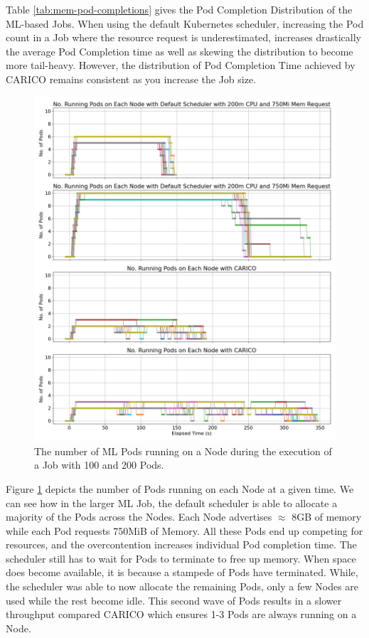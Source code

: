 Table \ref{tab:mem-pod-completions} gives the Pod Completion Distribution of the
ML-based Jobs. When using the default Kubernetes scheduler, increasing the Pod
count in a Job where the resource request is underestimated, increases
drastically the average Pod Completion time as well as skewing the distribution
to become more tail-heavy. However, the distribution of Pod Completion Time
achieved by CARICO remains consistent as you increase the Job size.

\begin{figure}[H]
    \centering
    \includegraphics[width=\textwidth]{images/ml-running-pods.png}
    \caption{The number of ML Pods running on a Node during the
    execution of a Job with 100 and 200 Pods.}
    \label{fig:ml-pod-running}
\end{figure}
Figure \ref{fig:ml-pod-running} depicts the number of Pods running on each Node
at a given time. We can see how in the larger ML Job, the default scheduler is
able to allocate a majority of the Pods across the Nodes. Each Node advertises
$\approx$ 8GB of memory while each Pod requests 750MiB of Memory. All these Pods
end up competing for resources, and the overcontention increases individual
Pod completion time. The scheduler still has to wait for Pods to terminate to
free up memory. When space does become available, it is because a
stampede of Pods have terminated. While, the scheduler was able to now allocate
the remaining Pods, only a few Nodes are used while the rest become idle. This
second wave of Pods results in a slower throughput compared CARICO which ensures
1-3 Pods are always running on a Node.

